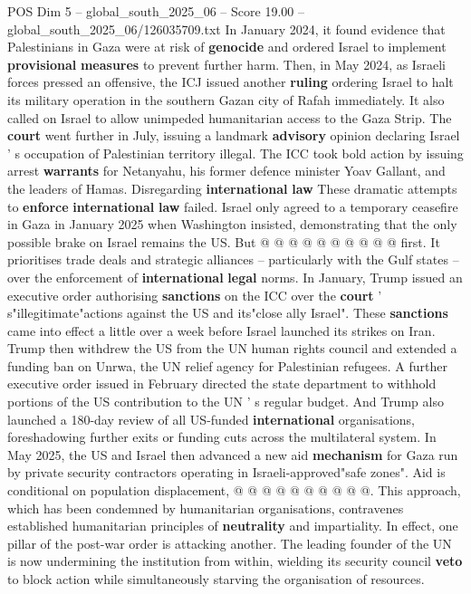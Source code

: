 \begin{textsample}{POS Dim 5 – global\_south\_2025\_06 – Score 19.00 – global\_south\_2025\_06/126035709.txt}
In January 2024, it found evidence that Palestinians in Gaza were at risk of \textbf{genocide} and ordered Israel to implement \textbf{provisional} \textbf{measures} to prevent further harm.
Then, in May 2024, as Israeli forces pressed an offensive, the ICJ issued another \textbf{ruling} ordering Israel to halt its military operation in the southern Gazan city of Rafah immediately.
It also called on Israel to allow unimpeded humanitarian access to the Gaza Strip.
The \textbf{court} went further in July, issuing a landmark \textbf{advisory} opinion declaring Israel ' s occupation of Palestinian territory illegal.
The ICC took bold action by issuing arrest \textbf{warrants} for Netanyahu, his former defence minister Yoav Gallant, and the leaders of Hamas.
Disregarding \textbf{international} \textbf{law} These dramatic attempts to \textbf{enforce} \textbf{international} \textbf{law} failed.
Israel only agreed to a temporary ceasefire in Gaza in January 2025 when Washington insisted, demonstrating that the only possible brake on Israel remains the US.
But @ @ @ @ @ @ @ @ @ @ first.
It prioritises trade deals and strategic alliances -- particularly with the Gulf states -- over the enforcement of \textbf{international} \textbf{legal} norms.
In January, Trump issued an executive order authorising \textbf{sanctions} on the ICC over the \textbf{court} ' s"illegitimate"actions against the US and its"close ally Israel".
These \textbf{sanctions} came into effect a little over a week before Israel launched its strikes on Iran.
Trump then withdrew the US from the UN human rights council and extended a funding ban on Unrwa, the UN relief agency for Palestinian refugees.
A further executive order issued in February directed the state department to withhold portions of the US contribution to the UN ' s regular budget.
And Trump also launched a 180-day review of all US-funded \textbf{international} organisations, foreshadowing further exits or funding cuts across the multilateral system.
In May 2025, the US and Israel then advanced a new aid \textbf{mechanism} for Gaza run by private security contractors operating in Israeli-approved"safe zones".
Aid is conditional on population displacement, @ @ @ @ @ @ @ @ @ @.
This approach, which has been condemned by humanitarian organisations, contravenes established humanitarian principles of \textbf{neutrality} and impartiality.
In effect, one pillar of the post-war order is attacking another.
The leading founder of the UN is now undermining the institution from within, wielding its security council \textbf{veto} to block action while simultaneously starving the organisation of resources.

\end{textsample}
